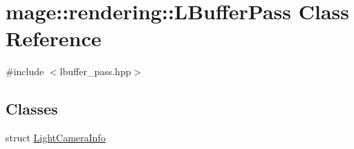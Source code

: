 \hypertarget{classmage_1_1rendering_1_1_l_buffer_pass}{}\section{mage\+:\+:rendering\+:\+:L\+Buffer\+Pass Class Reference}
\label{classmage_1_1rendering_1_1_l_buffer_pass}


{\ttfamily \#include $<$lbuffer\+\_\+pass.\+hpp$>$}

\subsection*{Classes}
\begin{DoxyCompactItemize}
\item 
struct \mbox{\hyperlink{structmage_1_1rendering_1_1_l_buffer_pass_1_1_light_camera_info}{Light\+Camera\+Info}}
\end{DoxyCompactItemize}
